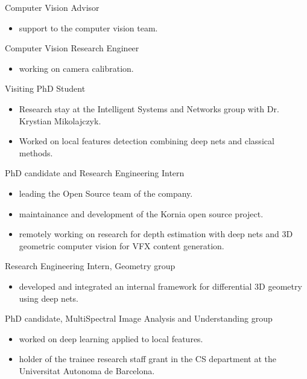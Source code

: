 \documentclass{article}
\begin{document}
\begin{llist}
Computer Vision Advisor\vspace{-0.33cm}
\begin{itemize}
 \item support to the computer vision team.
\end{itemize}

Computer Vision Research Engineer\vspace{-0.33cm}
\begin{itemize}
 \item working on camera calibration.
\end{itemize}

Visiting PhD Student
\vspace{-0.33cm}
\begin{itemize}
 \item Research stay at the Intelligent Systems and Networks group with Dr. Krystian Mikolajczyk.
 \item Worked on local features detection combining deep nets and classical methods.
\end{itemize}

PhD candidate and Research Engineering Intern
\vspace{-0.33cm}
\begin{itemize}
 \item leading the Open Source team of the company.
 \item maintainance and development of the Kornia open source project.
 \item remotely working on research for depth estimation with deep nets and 3D geometric computer vision for VFX content generation.
\end{itemize}

Research Engineering Intern, Geometry group
\vspace{-0.33cm}
\begin{itemize}
 \item developed and integrated an internal framework for differential 3D geometry using deep nets.
\end{itemize}

PhD candidate, MultiSpectral Image Analysis and Understanding group
\vspace{-0.33cm}
\begin{itemize}
 \item worked on deep learning applied to local features.
 \item holder of the trainee research staff grant in the CS department at the Universitat Autonoma de Barcelona.
\end{itemize}


\end{llist}
\end{document}
